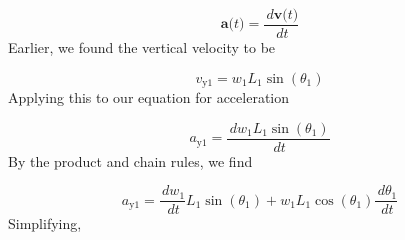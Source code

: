 \documentclass[12pt]{article}
\begin{document}
\begin{displaymath}
\symbf{a}\text{(}t\text{)}=\frac{\,d\symbf{v}\text{(}t\text{)}}{\,dt}
\end{displaymath}
Earlier, we found the vertical velocity to be

\begin{displaymath}
{v_{\text{y}1}}={w_{1}} {L_{1}} \sin\left({θ_{1}}\right)
\end{displaymath}
Applying this to our equation for acceleration

\begin{displaymath}
{a_{\text{y}1}}=\frac{\,d{w_{1}} {L_{1}} \sin\left({θ_{1}}\right)}{\,dt}
\end{displaymath}
By the product and chain rules, we find

\begin{displaymath}
{a_{\text{y}1}}=\frac{\,d{w_{1}}}{\,dt} {L_{1}} \sin\left({θ_{1}}\right)+{w_{1}} {L_{1}} \cos\left({θ_{1}}\right) \frac{\,d{θ_{1}}}{\,dt}
\end{displaymath}
Simplifying,
\end{document}

